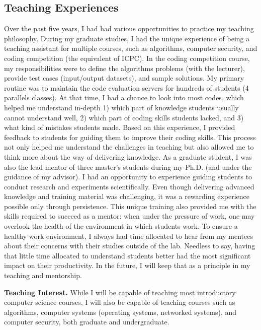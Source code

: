 \documentclass{NSF}
\newcommand{\BfPara}[1]{{\noindent\textbf{#1.}}\xspace}
\begin{document}
\subsection*{Teaching Experiences}
Over the past five years, I had had various opportunities to practice my teaching philosophy. During my graduate studies, I had the unique experience of being a teaching assistant for multiple courses, such as algorithms, computer security, and coding competition (the equivalent of ICPC). In the coding competition course, my responsibilities were to define the algorithms problems (with the lecturer), provide test cases (input/output datasets), and sample solutions. My primary routine was to maintain the code evaluation servers for hundreds of students (4 parallels classes). At that time, I had a chance to look into most codes, which helped me understand in-depth  1) which part of knowledge students usually cannot understand well, 2) which part of coding skills students lacked, and 3) what kind of mistakes students made. Based on this experience, I provided feedback to students for guiding them to improve their coding skills. This process not only helped me understand the challenges in teaching but also allowed me to think more about the way of delivering knowledge. As a graduate student, I was also the lead mentor of three master's students during my Ph.D. (and under the guidance of my advisor). I had an opportunity to experience guiding students to conduct research and experiments scientifically. Even though delivering advanced knowledge and training material was challenging, it was a rewarding experience possible only through persistence. This unique training also provided me with the skills required to succeed as a mentor: when under the pressure of work, one may overlook the health of the environment in which students work. To ensure a healthy work environment, I always had time allocated to hear from my mentees about their concerns with their studies outside of the lab. Needless to say, having that little time allocated to understand students better had the most significant impact on their productivity. In the future, I will keep that as a principle in my teaching and mentorship. 

\BfPara{Teaching Interest} While I will be capable of teaching most introductory computer science courses, I will also be capable of teaching courses such as algorithms, computer systems (operating systems, networked systems), and computer security, both graduate and undergraduate. 
\end{document}
